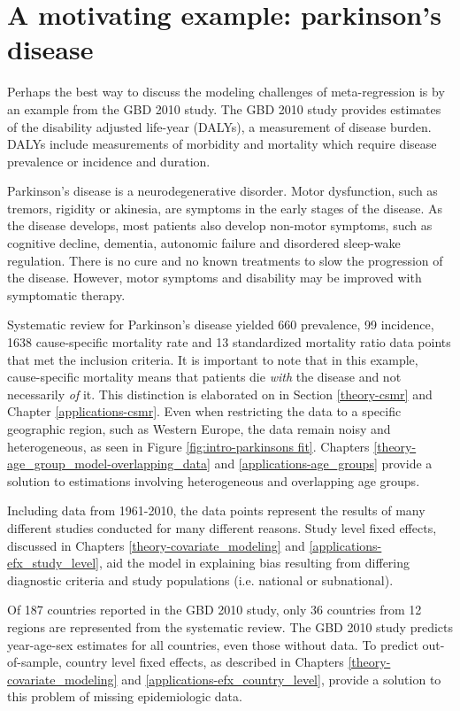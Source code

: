\section{A motivating example: parkinson's disease}
\label{intro-complete_ex}

Perhaps the best way to discuss the modeling challenges of meta-regression is by an example from the GBD 2010 study.  The GBD 2010 study provides estimates of the disability adjusted life-year (DALYs), a measurement of disease burden.  DALYs include measurements of morbidity and mortality which require disease prevalence or incidence and duration.

Parkinson's disease is a neurodegenerative disorder.  Motor dysfunction, such as tremors, rigidity or akinesia, are symptoms in the early stages of the disease.  As the disease develops, most patients also develop non-motor symptoms, such as cognitive decline, dementia, autonomic failure and disordered sleep-wake regulation.  There is no cure and no known treatments to slow the progression of the disease.  However, motor symptoms and disability may be improved with symptomatic therapy. \cite{poewe_natural_2006, pollock_prevalence_1966}

Systematic review for Parkinson's disease yielded 660 prevalence, 99 incidence, 1638 cause-specific mortality rate and 13 standardized mortality ratio data points that met the inclusion criteria.  It is important to note that in this example, cause-specific mortality means that patients die \emph{with} the disease and not necessarily \emph{of} it.  This distinction is elaborated on in Section \ref{theory-csmr} and Chapter \ref{applications-csmr}.  Even when restricting the data to a specific geographic region, such as Western Europe, the data remain noisy and heterogeneous, as seen in Figure \ref{fig:intro-parkinsons fit}. Chapters \ref{theory-age_group_model-overlapping_data} and \ref{applications-age_groups} provide a solution to estimations involving heterogeneous and overlapping age groups.

Including data from 1961-2010, the data points represent the results of many different studies conducted for many different reasons.  Study level fixed effects, discussed in Chapters \ref{theory-covariate_modeling} and \ref{applications-efx_study_level}, aid the model in explaining bias resulting from differing diagnostic criteria and study populations (i.e. national or subnational).

Of 187 countries reported in the GBD 2010 study, only 36 countries from 12 regions are represented from the systematic review.  The GBD 2010 study predicts year-age-sex estimates for all countries, even those without data.  To predict out-of-sample, country level fixed effects, as described in Chapters \ref{theory-covariate_modeling} and \ref{applications-efx_country_level}, provide a solution to this problem of missing epidemiologic data.

